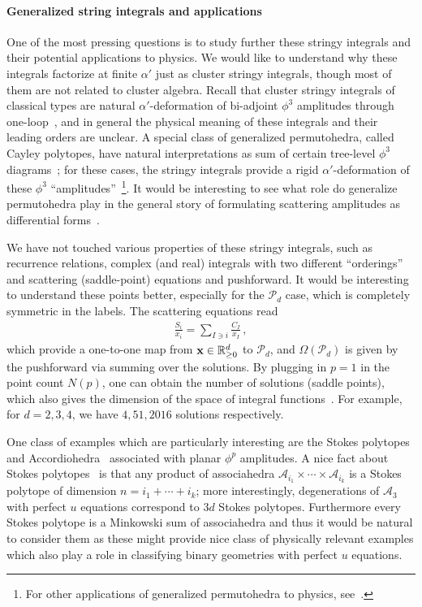 \documentclass[hidelinks,12pt]{article}
\newcommand{\bea}[1]{\begin{eqnarray}\label{#1} }
\newcommand{\eea}{\end{eqnarray}}
\def\bea{\begin{eqnarray}}
\def\eea{\end{eqnarray}}
\begin{document}
\paragraph{Generalized string integrals and applications} One of the most pressing questions is to study further these stringy integrals and their potential applications to physics. We would like to understand why these integrals factorize at finite $\alpha'$ just as cluster stringy integrals, though most of them are not related to cluster algebra. Recall that cluster stringy integrals of classical types are natural $\alpha'$-deformation of bi-adjoint $\phi^3$ amplitudes through one-loop~\cite{Arkani-Hamed:2019vag}, and in general the physical meaning of these integrals and their leading orders are unclear. A special class of generalized permutohedra, called Cayley polytopes, have natural interpretations as sum of certain tree-level $\phi^3$ diagrams~\cite{Gao:2017dek,He:2018pue}; for these cases, the stringy integrals provide a rigid $\alpha'$-deformation of these $\phi^3$ ``amplitudes''~\footnote{For other applications of generalized permutohedra to physics, see~\cite{early2017generalized,Early:2018zuw}.}. It would be interesting to see what role do generalize permutohedra play in the general story of formulating scattering amplitudes as differential forms~\cite{Arkani-Hamed:2017tmz, He:2018okq, Arkani-Hamed:2017mur, Arkani-Hamed:2019vag}.

We have not touched various properties of these stringy integrals, such as recurrence relations, complex (and real) integrals with two different ``orderings'' and scattering (saddle-point) equations and pushforward. It would be interesting to understand these points better, especially for the ${\mathscr P}_d$ case, which is completely symmetric in the labels. The scattering equations read
\bea
\frac{S_i}{x_i}=\sum_{I \ni i} \frac{C_I}{x_I}\,,
\eea
which provide a one-to-one map from ${\bf x}\in \mathbb{R}_{\geq 0}^d$ to ${\mathscr P}_d$, and $\Omega({\mathscr P}_d)$ is given by the pushforward via summing over the solutions. By plugging in $p=1$ in the point count $N(p)$, one can obtain the number of solutions (saddle points), which also gives the dimension of the space of integral functions~\cite{Arkani-Hamed:2019mrd}. For example, for $d=2, 3, 4$, we have $4, 51, 2016$ solutions respectively. 

One class of examples which are particularly interesting are the Stokes polytopes and Accordiohedra~\cite{Banerjee:2018tun,Raman:2019utu} associated with planar $\phi^{p}$ amplitudes. A nice fact about Stokes polytopes~\cite{Chapoton, Raman:2019utu} is that any product of associahedra ${\mathscr A}_{i_1}\times \cdots \times {\mathscr A}_{i_k}$ is a Stokes polytope of dimension $n=i_1+\cdots+i_k$; more interestingly, degenerations of ${\mathscr A_3}$ with perfect $u$ equations correspond to $3d$ Stokes polytopes. Furthermore every Stokes polytope is a Minkowski sum of associahedra \cite{Baryshnikov} and thus it would be natural to consider them as these might provide nice class of physically relevant examples which also play a role in classifying binary geometries with perfect $u$ equations.
\end{document}
